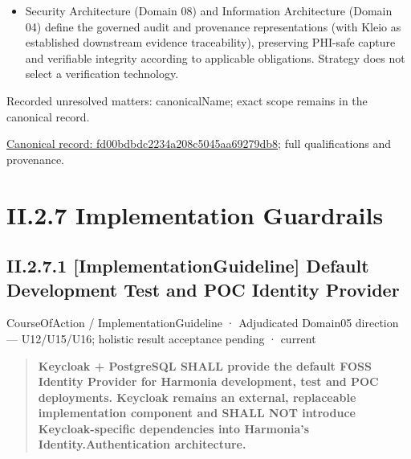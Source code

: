 \begin{itemize}


\item Security Architecture (Domain 08) and Information Architecture (Domain 04) define the governed audit and provenance representations (with Kleio as established downstream evidence traceability), preserving PHI-safe capture and verifiable integrity according to applicable obligations. Strategy does not select a verification technology.

\end{itemize}

{\small Recorded unresolved matters: canonicalName; exact scope remains in the canonical record.}\par
{\footnotesize \href{../../../../../../../continuum/strategy/course-of-action/fd00bdbdc2234a208c5045aa69279db8.md}{Canonical record: fd00bdbdc2234a208c5045aa69279db8}; full qualifications and provenance.}\par
\section*{II.2.7 Implementation Guardrails}
\label{navigation:II.2.7}

\subsection*{II.2.7.1 [ImplementationGuideline] Default Development Test and POC Identity Provider}
\label{navigation:II.2.7.1}

\label{element:f8874dd3bc5c4b68b1ece4eb2859d1d9}
{\small CourseOfAction / ImplementationGuideline · Adjudicated Domain05 direction — U12/U15/U16; holistic result acceptance pending · current}\par

\begin{quote}


\textbf{Keycloak + PostgreSQL SHALL provide the default FOSS Identity Provider for Harmonia development, test and POC deployments. Keycloak remains an external, replaceable implementation component and SHALL NOT introduce Keycloak-specific dependencies into Harmonia's Identity.Authentication architecture.}



\end{quote}


